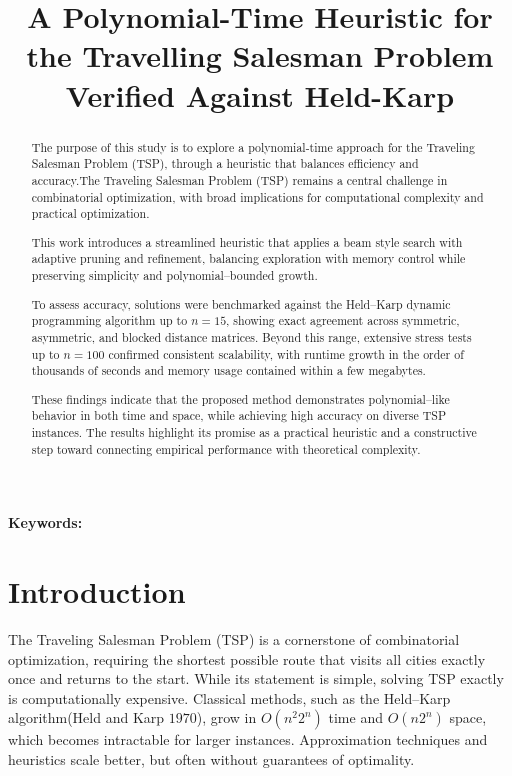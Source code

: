 \documentclass[sn-mathphys]{article}
\theoremstyle{thmstyleone}%
\theoremstyle{thmstyletwo}%
\theoremstyle{thmstylethree}%
\begin{document}
\title{A Polynomial-Time Heuristic for the Travelling Salesman Problem Verified Against Held-Karp}
\author*[1]{ }


\begin{abstract}
The purpose of this study is to explore a polynomial-time approach for the Traveling Salesman Problem (TSP), through a heuristic that balances efficiency and accuracy.The Traveling Salesman Problem (TSP) remains a central challenge in combinatorial optimization, with broad implications for computational complexity and practical optimization.

This work introduces a streamlined heuristic that applies a beam style search with adaptive pruning and refinement, balancing exploration with memory control while preserving simplicity and polynomial–bounded growth.

To assess accuracy, solutions were benchmarked against the Held–Karp dynamic programming algorithm up to $n=15$, showing exact agreement across symmetric, asymmetric, and blocked distance matrices. Beyond this range, extensive stress tests up to $n=100$ confirmed consistent scalability, with runtime growth in the order of thousands of seconds and memory usage contained within a few megabytes.

These findings indicate that the proposed method demonstrates polynomial–like behavior in both time and space, while achieving high accuracy on diverse TSP instances. The results highlight its promise as a practical heuristic and a constructive step toward connecting empirical performance with theoretical complexity.
\end{abstract}
\noindent\textbf{Keywords:} 
\maketitle
\section{Introduction}\label{sec1}
The Traveling Salesman Problem (TSP) is a cornerstone of combinatorial optimization, requiring the shortest possible route that visits all cities exactly once and returns to the start. While its statement is simple, solving TSP exactly is computationally expensive. Classical methods, such as the Held--Karp algorithm(Held and Karp $1970$), grow in $O(n^2 2^n)$ time and $O(n2^n)$ space, which becomes intractable for larger instances. Approximation techniques and heuristics scale better, but often without guarantees of optimality.  
\end{document}
